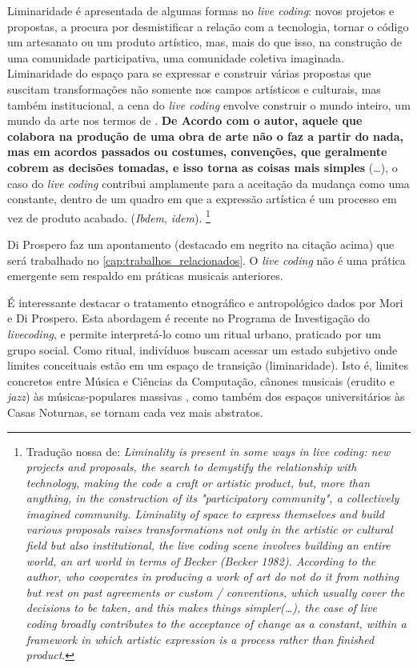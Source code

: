 \begin{citacao}
Liminaridade é apresentada de algumas formas no \emph{live coding}: novos projetos e propostas, a procura por desmistificar a relação com a tecnologia, tornar o código um artesanato ou um produto artístico, mas, mais do que isso, na construção de uma comunidade participativa, uma comunidade coletiva imaginada. Liminaridade do espaço para se expressar e construir várias propostas que suscitam transformações não somente nos campos artísticos e culturais, mas também institucional, a cena do \emph{live coding} envolve construir o mundo inteiro, um mundo da arte nos termos de . \textbf{De Acordo com o autor, aquele que colabora na produção de uma obra de arte não o faz a partir do nada, mas em acordos passados ou costumes, convenções, que geralmente cobrem as decisões tomadas, e isso torna as coisas mais simples} (\ldots), o caso do \emph{live coding} contribui amplamente para a aceitação da mudança como uma constante, dentro de um quadro em que a expressão artística é um processo em vez de produto acabado. (\emph{Ibdem}, \emph{idem}). \footnote{Tradução nossa de: \emph{Liminality is present in some ways in live coding: new projects and proposals, the search to demystify the relationship with technology, making the code a craft or artistic product, but, more than anything, in the construction of its "participatory community", a collectively imagined community. Liminality of space to express themselves and build various proposals raises transformations not only in the artistic or cultural field but also institutional, the live coding scene involves building an entire world, an art world in terms of Becker (Becker 1982). According to the author, who cooperates in producing a work of art do not do it from nothing but rest on past agreements or custom / conventions, which usually cover the decisions to be taken, and this makes things simpler(\ldots),  the case of live coding broadly contributes to the acceptance of change as a constant, within a framework in which artistic expression is a process rather than finished product}.}
\end{citacao}

Di Prospero faz um apontamento (destacado em negrito na citação acima) que será trabalhado no \autoref{cap:trabalhos_relacionados}. O \emph{live coding} não é uma prática emergente sem respaldo em práticas musicais anteriores.

É interessante destacar o tratamento etnográfico e antropológico dados por Mori e Di Prospero. Esta abordagem é recente no Programa de Investigação do \emph{livecoding}, e permite interpretá-lo como um ritual urbano, praticado por um grupo social. Como ritual, indivíduos buscam acessar um estado subjetivo onde limites conceituais estão em um espaço de transição (liminaridade). Isto é, limites concretos entre  Música e Ciências da Computação, cânones musicais (erudito e \emph{jazz}) às músicas-populares massivas \cite{sa_se_2009}, como também dos espaços universitários às Casas Noturnas, se tornam cada vez mais abstratos.

